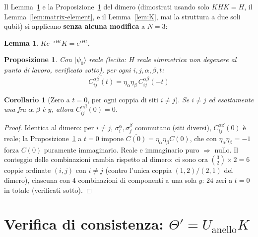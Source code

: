\documentclass[11pt,a4paper]{article}
\newtheorem{lemma}{Lemma}
\newtheorem{proposizione}{Proposizione}
\newtheorem{corollario}{Corollario}
\begin{document}
Il Lemma~\ref{lem:K-tempo} e la Proposizione~\ref{prop:K-correlatore} del dimero (dimostrati
usando solo $KHK=H$, il Lemma~\ref{lem:matrix-element}, e il Lemma~\ref{lem:K}, mai la struttura
a due soli qubit) si applicano \textbf{senza alcuna modifica} a $N=3$:

\begin{lemma}
\label{lem:K-tempo}
$Ke^{-iHt}K=e^{iHt}$.
\end{lemma}

\begin{proposizione}
\label{prop:K-correlatore}
Con $|\psi_0\rangle$ reale (lecito: $H$ reale simmetrica non degenere al punto di lavoro,
verificato sotto), per ogni $i,j,\alpha,\beta,t$:
\begin{equation}
\boxed{\;\overline{C_{ij}^{\alpha\beta}(t)} = \eta_\alpha\eta_\beta\,C_{ij}^{\alpha\beta}(-t)\;}
\end{equation}
\end{proposizione}

\begin{corollario}[Zero a $t=0$, per ogni coppia di siti $i\neq j$]
\label{cor:zero-t0}
Se $i\neq j$ ed esattamente una fra $\alpha,\beta$ è $y$, allora $C_{ij}^{\alpha\beta}(0)=0$.
\end{corollario}
\begin{proof}
Identica al dimero: per $i\neq j$, $\sigma_i^\alpha,\sigma_j^\beta$ commutano (siti diversi),
$C_{ij}^{\alpha\beta}(0)$ è reale; la Proposizione~\ref{prop:K-correlatore} a $t=0$ impone
$\overline{C(0)}=\eta_\alpha\eta_\beta C(0)$, che con $\eta_\alpha\eta_\beta=-1$ forza $C(0)$
puramente immaginario. Reale e immaginario puro $\Rightarrow$ nullo. Il conteggio delle
combinazioni cambia rispetto al dimero: ci sono ora $\binom{3}{2}\times2=6$ coppie ordinate
$(i,j)$ con $i\neq j$ (contro l'unica coppia $(1,2)/(2,1)$ del dimero), ciascuna con $4$
combinazioni di componenti a una sola $y$: $24$ zeri a $t=0$ in totale (verificati sotto).
\end{proof}

\section{Verifica di consistenza: $\Theta'=U_{\mathrm{anello}}K$}
\end{document}
